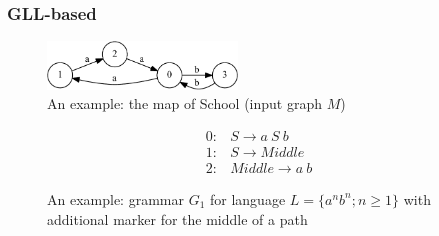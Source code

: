 \documentclass{beamer}
\begin{document}
\begin{frame}
  \transwipe[direction=90]
  \frametitle{GLL-based}
\begin{figure}[ht]
    \centering
        \includegraphics[width=0.45\textwidth]{pictures/input.pdf}
        \caption{An example: the map of School (input graph $M$)}
\end{figure}
\begin{figure}[ht]
\centering
   \[
\begin{array}{rl} 
   0:& S \rightarrow a \ S \ b \\
   1:& S \rightarrow Middle \\
   2:& Middle \rightarrow a \ b
\end{array}
\]
   \caption{An example: grammar $G_1$ for language $L=\{a^n b^n; n \geq 1\}$ with additional marker for the middle of a path}
   \label{grammarG}        
    \end{figure}
\end{frame}
\end{document}
